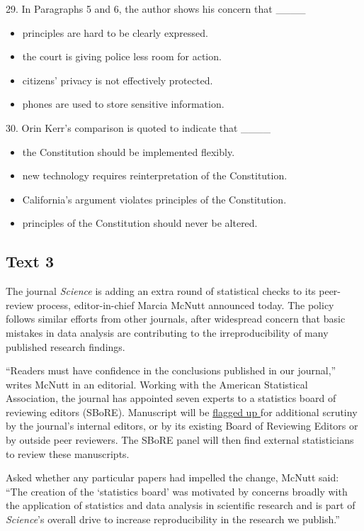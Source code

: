 \documentclass[UTF8,11pt]{ctexart}
\begin{document}
29. In Paragraphs 5 and 6, the author shows his concern that \_\_\_\_


\begin{itemize}[leftmargin=2em,itemsep=.2em,topsep=.4em]\item[A.] principles are hard to be clearly expressed.
\item[B.] the court is giving police less room for action.
\item[C.] citizens’ privacy is not effectively protected.
\item[D.] phones are used to store sensitive information.
\end{itemize}

30. Orin Kerr’s comparison is quoted to indicate that \_\_\_\_


\begin{itemize}[leftmargin=2em,itemsep=.2em,topsep=.4em]\item[A.] the Constitution should be implemented flexibly.
\item[B.] new technology requires reinterpretation of the Constitution.
\item[C.] California’s argument violates principles of the Constitution.
\item[D.] principles of the Constitution should never be altered.
\end{itemize}

\subsection*{\textbf{Text 3}}


The journal \textit{Science} is adding an extra round of statistical checks to its peer-review process, editor-in-chief Marcia McNutt announced today. The policy follows similar efforts from other journals, after widespread concern that basic mistakes in data analysis are contributing to the irreproducibility of many published research findings.


“Readers must have confidence in the conclusions published in our journal,” writes McNutt in an editorial. Working with the American Statistical Association, the journal has appointed seven experts to a statistics board of reviewing editors (SBoRE). Manuscript will be \uline{flagged up }for additional scrutiny by the journal’s internal editors, or by its existing Board of Reviewing Editors or by outside peer reviewers. The SBoRE panel will then find external statisticians to review these manuscripts.


Asked whether any particular papers had impelled the change, McNutt said: “The creation of the ‘statistics board’ was motivated by concerns broadly with the application of statistics and data analysis in scientific research and is part of \textit{Science}’s overall drive to increase reproducibility in the research we publish.”
\end{document}
